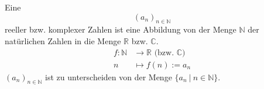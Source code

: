 Eine  $$(a_n)_{n \in \mathbb{N}}$$ reeller bzw. komplexer Zahlen ist eine Abbildung von der Menge $\mathbb{N}$ der natürlichen Zahlen in die Menge $\mathbb{R}$ bzw. $\mathbb{C}$.
\begin{align*}
    f : \mathbb{N} & \longrightarrow \mathbb{R} \text{ (bzw. } \mathbb{C} \text{)} \\
    n & \longmapsto f(n) := a_n
\end{align*}
$(a_n)_{n \in \mathbb{N}}$ ist zu unterscheiden von der Menge $\{a_n \ | \ n \in \mathbb{N}\}$.